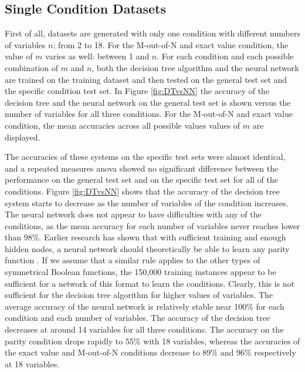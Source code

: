 \documentclass[letterpaper]{article} %
\begin{document}
\subsection{Single Condition Datasets}
First of all, datasets are generated with only one condition with different numbers of variables $n$; from 2 to 18.  For the M-out-of-N and exact value condition, the value of $m$ varies as well: between 1 and $n$. For each condition and each possible combination of $m$ and $n$, both the decision tree algorithm and the neural network are trained on the training dataset and then tested on the general test set and the specific condition test set. In Figure \ref{fig:DTvsNN} the accuracy of the decision tree and the neural network on the general test set is shown versus the number of variables for all three conditions. For the M-out-of-N and exact value condition, the mean accuracies across all possible values values of $m$ are displayed.

The accuracies of these systems on the specific test sets were almost identical, and a repeated measures anova showed no significant difference between the performance on the general test set and on the specific test set for all of the conditions. Figure \ref{fig:DTvsNN} shows that the accuracy of the decision tree system starts to decrease as the number of variables of the condition increases. The neural network does not appear to have difficulties with any of the conditions, as the mean accuracy for each number of variables never reaches lower than 98\%. Earlier research has shown that with sufficient training and enough hidden nodes, a neural network should theoretically be able to learn any parity function \cite{wilamowski2003solving}. If we assume that a similar rule applies to the other types of symmetrical Boolean functions, the 150,000 training instances appear to be sufficient for a network of this format to learn the conditions. Clearly, this is not sufficient for the decision tree algorithm for higher values of variables. The average accuracy of the neural network is relatively stable near 100\% for each condition and each number of variables. The accuracy of the decision tree decreases at around 14 variables for all three conditions. The accuracy on the parity condition drops rapidly to 55\% with 18 variables, whereas the accuracies of the exact value and M-out-of-N conditions decrease to 89\% and 96\% respectively at 18 variables. 

\end{document}

